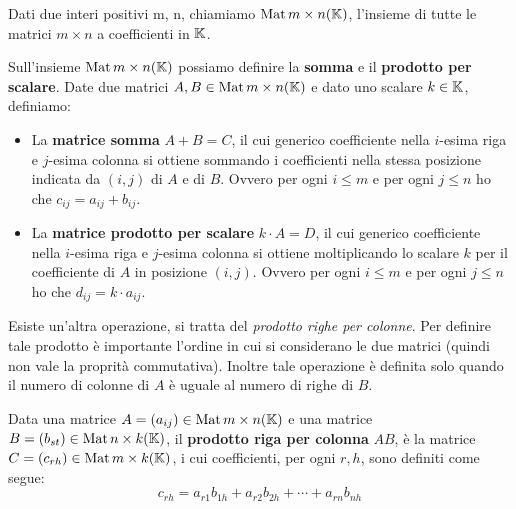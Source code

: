 \begin{definition}
	Dati due interi positivi m, n, chiamiamo $\operatorname{Mat}{m \times n} (\mathbb{K})$, l'insieme di tutte le matrici
	$m \times n$ a coefficienti in $\mathbb{K}$.
\end{definition}

\begin{definition}
	Sull'insieme $\operatorname{Mat}{m \times n} (\mathbb{K})$ possiamo definire la \textbf{somma} e il
	\textbf{prodotto per scalare}. Date due matrici $A, B \in \operatorname{Mat}{m \times n} (\mathbb{K})$ e dato uno scalare
	$k \in \mathbb{K}$, definiamo:
	\begin{itemize}
		\item La \textbf{matrice somma} $A + B = C$, il cui generico coefficiente nella $i$-esima riga e
		      $j$-esima colonna si ottiene sommando i coefficienti nella stessa posizione indicata da $(i, j)$
		      di $A$ e di $B$. Ovvero per ogni $i \leq m$ e per ogni $j \leq n$ ho che $c_{ij} = a_{ij} + b_{ij}$.
		\item La \textbf{matrice prodotto per scalare} $k \cdot A = D$, il cui generico coefficiente nella
		      $i$-esima riga e $j$-esima colonna si ottiene moltiplicando lo scalare $k$ per il coefficiente
		      di $A$ in posizione $(i, j)$. Ovvero per ogni $i \leq m$ e per ogni $j \leq n$ ho che
		      $d_{ij} = k \cdot a_{ij}$.
	\end{itemize}
\end{definition}

Esiste un'altra operazione, si tratta del \emph{prodotto righe per colonne}. Per definire tale prodotto è
importante l'ordine in cui si considerano le due matrici (quindi non vale la proprità commutativa). Inoltre
tale operazione è definita solo quando il numero di colonne di $A$ è uguale al numero di righe di $B$.

\begin{definition}
	Data una matrice $A = (a_{ij}) \in \operatorname{Mat}{m \times n} (\mathbb{K})$ e una matrice
	$B = (b_{st}) \in \operatorname{Mat}{n \times k} (\mathbb{K})$, il \textbf{prodotto riga per colonna} $AB$, è la matrice
	$C = (c_{rh}) \in \operatorname{Mat}{m \times k} (\mathbb{K})$, i cui coefficienti, per ogni $r, h$, sono definiti come
	segue:
	\[ c_{rh} = a_{r1} b_{1h} + a_{r2} b_{2h} + \cdots + a_{rn} b_{nh} \]
\end{definition}

